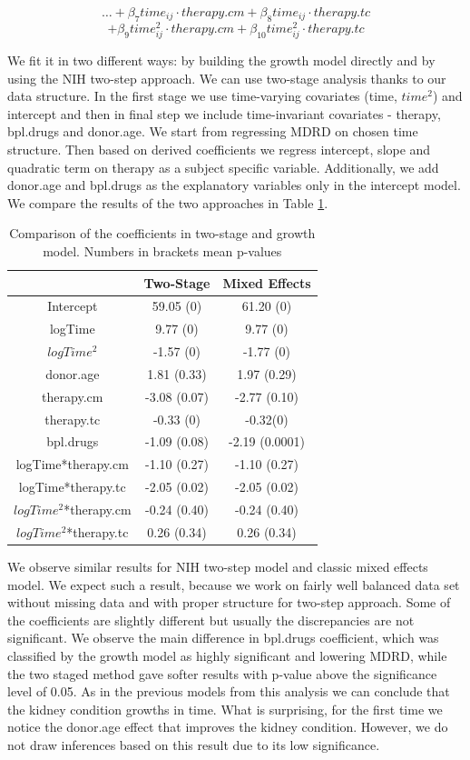 \documentclass[num-refs]{wiley-article}
\begin{document}
$$\dots + \beta_7 time_{ij} \cdot therapy.cm  + \beta_8 time_{ij} \cdot therapy.tc$$ 
$$+ \beta_9 time_{ij}^2 \cdot therapy.cm + \beta_{10} time_{ij}^2 \cdot therapy.tc $$

We fit it in two different ways: by building the growth model directly and by using the NIH two-step approach. We can use two-stage analysis thanks to our data structure. In the first stage we  use time-varying covariates (time, $time^2$) and intercept and then in final step we include time-invariant covariates - therapy, bpl.drugs and donor.age.  We start from regressing MDRD on chosen time structure. Then based on derived coefficients we regress intercept, slope and quadratic term on therapy as a subject specific variable. Additionally, we add donor.age and bpl.drugs as the explanatory variables only in the intercept model. We compare the results of the two approaches in Table \ref{growth}.


\begin{table}[H]
\centering
\begin{tabular}{c c c}
     & Two-Stage & Mixed Effects \\ \hline
    Intercept & 59.05 (0) & 61.20 (0) \\
    logTime & 9.77 (0) & 9.77 (0)\\
    $logTime^2$ & -1.57 (0)& -1.77 (0)\\
   donor.age & 1.81 (0.33) & 1.97 (0.29)\\
    therapy.cm & -3.08 (0.07) &-2.77 (0.10)\\
   therapy.tc & -0.33 (0) & -0.32(0)\\
      bpl.drugs & -1.09 (0.08) & -2.19 (0.0001)\\
     logTime*therapy.cm &-1.10 (0.27) & -1.10 (0.27)\\
    logTime*therapy.tc & -2.05 (0.02) & -2.05 (0.02) \\
     $logTime^2$*therapy.cm & -0.24 (0.40) & -0.24 (0.40) \\
    $logTime^2$*therapy.tc & 0.26 (0.34) &  0.26 (0.34)\\

    \hline
  \end{tabular}
\caption{Comparison of the coefficients in two-stage and growth model. Numbers in brackets mean p-values} \label{growth}
\end{table}

We observe similar results for NIH two-step model and classic mixed effects model. We expect such a result, because we work on fairly well balanced data set without missing data and with proper structure for two-step approach. Some of the coefficients are slightly different but usually the discrepancies are not significant. We observe the main difference in bpl.drugs coefficient, which was classified by the growth model as highly significant and lowering MDRD, while the two staged method gave softer results with p-value above the significance level of 0.05. As in the previous models from this analysis we can conclude that the kidney condition growths in time. What is surprising, for the first time we notice the donor.age effect that improves the kidney condition.  However, we do not draw inferences based on this result due to its low significance.
\end{document}
